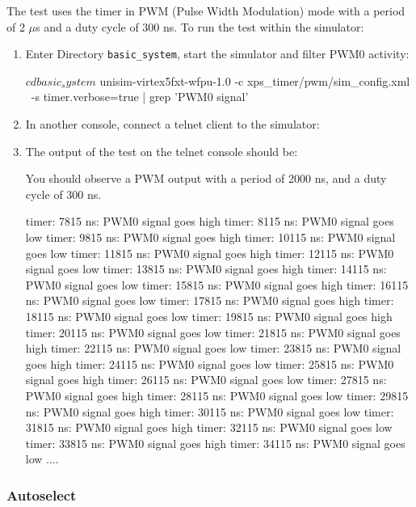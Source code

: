 The test uses the timer in PWM (Pulse Width Modulation) mode with a period of 2 $\mu$s and a duty cycle of 300 ns.
\noindent To run the test within the simulator:
\begin{enumerate}

\item Enter Directory \texttt{basic\_system}, start the simulator and filter PWM0 activity:
\begin{script}
$ cd basic_system
$ unisim-virtex5fxt-wfpu-1.0 -c xps_timer/pwm/sim_config.xml \
                             -s timer.verbose=true | grep 'PWM0 signal'
\end{script}
\item In another console, connect a telnet client to the simulator:
\begin{script}
$ telnet localhost 1234
\end{script}
\item The output of the test on the telnet console should be:
\begin{script}
You should observe a PWM output with a period of 2000 ns, and a duty cycle of 300 ns.
\end{script}
\begin{script}
timer: 7815 ns: PWM0 signal goes high
timer: 8115 ns: PWM0 signal goes low
timer: 9815 ns: PWM0 signal goes high
timer: 10115 ns: PWM0 signal goes low
timer: 11815 ns: PWM0 signal goes high
timer: 12115 ns: PWM0 signal goes low
timer: 13815 ns: PWM0 signal goes high
timer: 14115 ns: PWM0 signal goes low
timer: 15815 ns: PWM0 signal goes high
timer: 16115 ns: PWM0 signal goes low
timer: 17815 ns: PWM0 signal goes high
timer: 18115 ns: PWM0 signal goes low
timer: 19815 ns: PWM0 signal goes high
timer: 20115 ns: PWM0 signal goes low
timer: 21815 ns: PWM0 signal goes high
timer: 22115 ns: PWM0 signal goes low
timer: 23815 ns: PWM0 signal goes high
timer: 24115 ns: PWM0 signal goes low
timer: 25815 ns: PWM0 signal goes high
timer: 26115 ns: PWM0 signal goes low
timer: 27815 ns: PWM0 signal goes high
timer: 28115 ns: PWM0 signal goes low
timer: 29815 ns: PWM0 signal goes high
timer: 30115 ns: PWM0 signal goes low
timer: 31815 ns: PWM0 signal goes high
timer: 32115 ns: PWM0 signal goes low
timer: 33815 ns: PWM0 signal goes high
timer: 34115 ns: PWM0 signal goes low
....
\end{script}
\end{enumerate}

\subsubsection{Autoselect}

